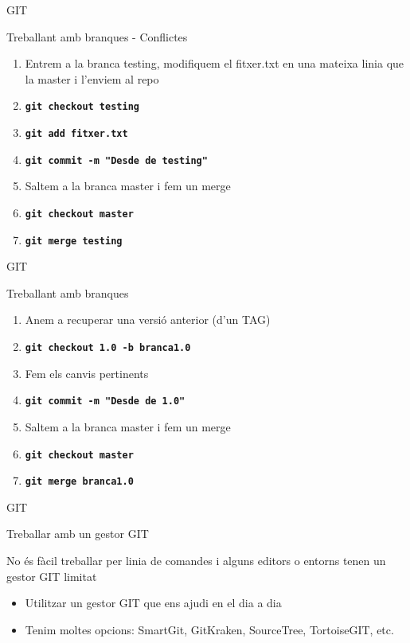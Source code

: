 \documentclass[10pt,xcolor={rgb}]{beamer}
\begin{document}
    \begin{frame}[fragile]{GIT}
      \begin{block}{Treballant amb branques - Conflictes}

        \begin{enumerate}
          \item Entrem a la branca testing, modifiquem el fitxer.txt en una mateixa linia que la master i l'enviem al repo
          \item \texttt{\textbf{git checkout testing}}
          \item \texttt{\textbf{git add fitxer.txt}}
          \item \texttt{\textbf{git commit -m "Desde de testing"}}
          \item Saltem a la branca master i fem un merge
          \item \texttt{\textbf{git checkout master}}
          \item \texttt{\textbf{git merge testing}}
        \end{enumerate}

      \end{block}
    \end{frame}

    \begin{frame}[fragile]{GIT}
      \begin{block}{Treballant amb branques}

        \begin{enumerate}
          \item Anem a recuperar una versió anterior (d'un TAG)
          \item \texttt{\textbf{git checkout 1.0 -b branca1.0}}
          \item Fem els canvis pertinents
          \item \texttt{\textbf{git commit -m "Desde de 1.0"}}
          \item Saltem a la branca master i fem un merge
          \item \texttt{\textbf{git checkout master}}
          \item \texttt{\textbf{git merge branca1.0}}
        \end{enumerate}

      \end{block}
    \end{frame}

    \begin{frame}[fragile]{GIT}
      \begin{block}{Treballar amb un gestor GIT}

        No és fàcil treballar per linia de comandes i alguns editors o entorns tenen un gestor GIT limitat
        \begin{itemize}
          \item Utilitzar un gestor GIT que ens ajudi en el dia a dia
          \item Tenim moltes opcions:  SmartGit, GitKraken, SourceTree, TortoiseGIT, etc.
        \end{itemize}

      \end{block}
    \end{frame}
\end{document}
